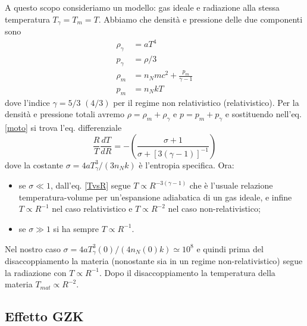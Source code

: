 A questo scopo consideriamo un modello: gas ideale e radiazione alla stessa
temperatura $T_{\gamma}=T_{m}=T$.  Abbiamo che densità e pressione delle due
componenti sono
\begin{subequations}
  \begin{align}
    \rho_{\gamma} & = a T^4 \\
    p_{\gamma} &=\rho/3  \\
    \rho_{m}    & = n_N m c^2 + \frac{p_{m}}{\gamma-1} \\
    p_m &=n_N kT
  \end{align}
\end{subequations}
dove l'indice $\gamma=5/3$ $(4/3)$ per il regime non relativistico
(relativistico).  Per la densità e pressione totali avremo $\rho =
\rho_{m}+\rho_{\gamma}$ e $p=p_{m}+p_{\gamma}$ e sostituendo
nell'eq. \eqref{moto} si trova l'eq. differenziale
\begin{equation}
  \label{TvsR}
  \frac{R}{T} \frac{dT}{dR} = -
  \left(\frac{\sigma+1}{\sigma+[3(\gamma-1)]^{-1}}\right)
\end{equation}
dove la costante $\sigma = 4 a T^3_{\gamma}/(3 n_N k)$ è l'entropia specifica.  Ora:
\begin{itemize}
\item se $\sigma \ll 1$, dall'eq. \eqref{TvsR} segue $T \propto
  R^{-3(\gamma-1)}$ che è l'usuale relazione temperatura-volume per
  un'espansione adiabatica di un gas ideale, e infine
  $T \propto R^{-1}$ nel caso relativistico e $ T \propto R^{-2}$ nel caso non-relativistico;
\item se $\sigma \gg 1$ si ha sempre $T \propto R^{-1}$.
\end{itemize}

Nel nostro caso $\sigma = 4 a T^3_{\gamma}(0)/(4 n_N(0) k) \simeq 10^8$ e quindi
prima del disaccoppiamento la materia (nonostante sia in un regime
non-relativistico) segue la radiazione con $T \propto R^{-1}$.  Dopo il
disaccoppiamento la temperatura della materia $T_{mat}\propto R^{-2}$.

\subsection{Effetto GZK}

